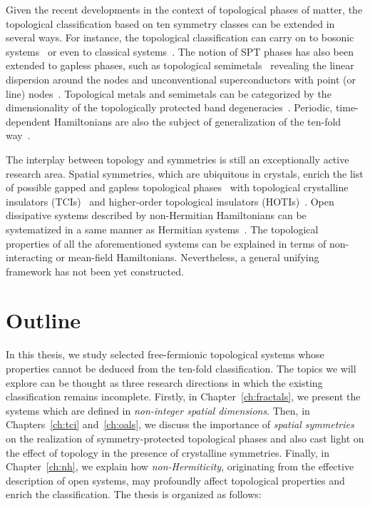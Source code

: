 Given the recent developments in the context of topological phases of matter, the topological classification based on ten symmetry classes can be extended in several ways. For instance, the topological classification can carry on to bosonic systems~\cite{zhou2019classification} or even to classical systems~\cite{SusstrunkE4767}. The notion of SPT phases has also been extended to gapless phases, such as topological semimetals~\cite{TSMrev} revealing the linear dispersion around the nodes and unconventional superconductors with point (or line) nodes~\cite{Schnyder_NODAL}. Topological metals and semimetals can be categorized by the dimensionality of the topologically protected band degeneracies~\cite{PhysRevB.88.125129, PhysRevB.90.205136,RevModPhys.88.035005}. Periodic, time-dependent Hamiltonians are also the subject of generalization of the ten-fold way~\cite{PhysRevB.96.155118}.

The interplay between topology and symmetries is still an exceptionally active research area. Spatial symmetries, which are ubiquitous in crystals, enrich the list of possible gapped and gapless topological phases~\cite{PhysRevB.90.165114, PhysRevB.88.125129, PhysRevB.90.205136, PhysRevB.99.075105} with topological crystalline insulators (TCIs)~\cite{tcirev} and higher-order topological insulators (HOTIs)~\cite{Schindler2018}. Open dissipative systems described by non-Hermitian Hamiltonians can be systematized in a same manner as Hermitian systems~\cite{PhysRevB.101.205417, PhysRevX.9.041015, PhysRevLett.120.146402}. The topological properties of all the aforementioned systems can be explained in terms of non-interacting or mean-field Hamiltonians. Nevertheless, a general unifying framework has not been yet constructed.

\section*{Outline}
In this thesis, we study selected free-fermionic topological systems whose properties cannot be deduced from the ten-fold classification. The topics we will explore can be thought as three research directions in which the existing classification remains incomplete. Firstly, in Chapter~\ref{ch:fractals}, we present the systems which are defined in \emph{non-integer spatial dimensions}. Then, in Chapters~\ref{ch:tci} and~\ref{ch:oals}, we discuss the importance of \emph{spatial symmetries} on the realization of symmetry-protected topological phases and also cast light on the effect of topology in the presence of crystalline symmetries. Finally, in Chapter~\ref{ch:nh}, we explain how \emph{non-Hermiticity}, originating from the effective description of open systems, may profoundly affect topological properties and enrich the classification. The thesis is organized as follows:

